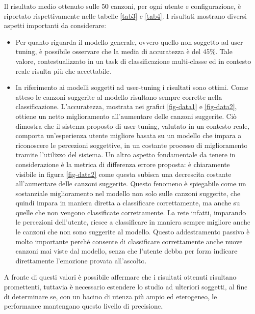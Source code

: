 \documentclass[11pt]{report}
\begin{document}
Il risultato medio ottenuto sulle 50 canzoni, per ogni utente e configurazione, è riportato rispettivamente nelle tabelle \ref{tab3} e \ref{tab4}. I risultati mostrano diversi aspetti importanti da considerare:
\begin{itemize}
    \item Per quanto riguarda il modello generale, ovvero quello non soggetto ad user-tuning, è possibile osservare che la media di accuratezza è del 45\%. Tale valore, contestualizzato in un task di classificazione multi-classe ed in contesto reale risulta più che accettabile. 
    
    \item In riferimento ai modelli soggetti ad user-tuning i risultati sono ottimi. Come atteso le canzoni suggerite al modello risultano sempre corrette nella classificazione. L'accuratezza, mostrata nei grafici \ref{fig-data1} e \ref{fig-data2}, ottiene un netto miglioramento all'aumentare delle canzoni suggerite. Ciò dimostra che il sistema proposto di user-tuning, valutato in un contesto reale, comporta un'esperienza utente migliore basata su un modello che impara a riconoscere le percezioni soggettive, in un costante processo di miglioramento tramite l'utilizzo del sistema. Un altro aspetto fondamentale da tenere in considerazione è la metrica di differenza errore proposta: è chiaramente visibile in figura \ref{fig-data2} come questa subisca una decrescita costante all'aumentare delle canzoni suggerite. Questo fenomeno è spiegabile come un sostanziale miglioramento nel modello non solo sulle canzoni suggerite, che quindi impara in maniera diretta a classificare correttamente, ma anche su quelle che non vengono classificate correttamente. La rete infatti, imparando le percezioni dell'utente, riesce a classificare in maniera sempre migliore anche le canzoni che non sono suggerite al modello. Questo addestramento passivo è molto importante perché consente di classificare correttamente anche nuove canzoni mai viste dal modello, senza che l'utente debba per forza indicare direttamente l'emozione provata all'ascolto.
\end{itemize}

A fronte di questi valori è possibile affermare che i risultati ottenuti risultano promettenti, tuttavia è necessario estendere lo studio ad ulteriori soggetti, al fine di determinare se, con un bacino di utenza più ampio ed eterogeneo, le performance mantengano questo livello di precisione.


\newpage
\end{document}
